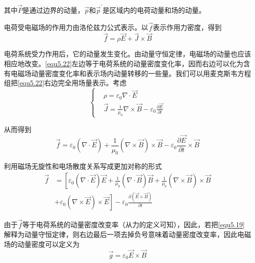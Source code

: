 \documentclass[UTF8]{ctexart}
\begin{document}
\noindent 其中$\vec{P}$是通过边界的动量，$\vec{p}$和$\vec{p}^{\prime}$是区域内的电荷动量和场的动量。

    电荷受电磁场的作用力由洛伦兹力公式表示。以$\vec{f}$表示作用力密度，得到
    \begin{equation}
        \vec{f} = \rho \vec{E} + \vec{J} \times \vec{B}\label{equ5.22}
    \end{equation}

\noindent 电荷系统受力作用后，它的动量发生变化。由动量守恒定律，电磁场的动量也应该相应地改变。\autoref{equ5.22}左边等于电荷系统的动量密度变化率，因而右边可以化为含有电磁场动量密度变化率和表示场内动量转移的一些量。我们可以用麦克斯韦方程组把\autoref{equ5.22}右边完全用场量表示。考虑
\begin{equation}
    \left \{ \begin{aligned}
        &\rho = \varepsilon_0 \nabla \cdot \vec{E} \\
        &\vec{J} = \frac{1}{\mu_0} \nabla \times \vec{B} - \varepsilon_0 \frac{\partial \vec{E}}{\partial t}
    \end{aligned} \right.
\end{equation}

\noindent 从而得到
\begin{equation}
    \vec{f} = \varepsilon_0 (\nabla \cdot \vec{E}) + \frac{1}{\mu_0}(\nabla \times \vec{B})\times \vec{B} - \varepsilon_0 \frac{\partial \vec{E}}{\partial t} \times \vec{B}
\end{equation}

\noindent 利用磁场无旋性和电场散度关系写成更加对称的形式
\begin{equation}
    \begin{aligned}
        \vec{f} &= \left[\varepsilon_0 (\nabla \cdot \vec{E}) \vec{E} + \frac{1}{\mu_0} (\nabla \cdot \vec{B}) \vec{B} + \frac{1}{\mu_0} (\nabla \times \vec{B}) \times \vec{B} \right.\\
        &+ \left.\varepsilon_0(\nabla \times \vec{E}) \times \vec{E}\right] - \varepsilon_0 \frac{\partial (\vec{E} \times \vec{B})}{\partial t}\label{equ5.19}
    \end{aligned}
\end{equation}

    由于$\vec{f}$等于电荷系统的动量密度改变率（从力的定义可知），因此，若把\autoref{equ5.19}解释为动量守恒定律，则右边最后一项去掉负号意味着动量密度改变率，因此电磁场的动量密度可以定义为
    \begin{equation}
        \vec{g} = \varepsilon_0 \vec{E} \times \vec{B}
    \end{equation}
\end{document}
